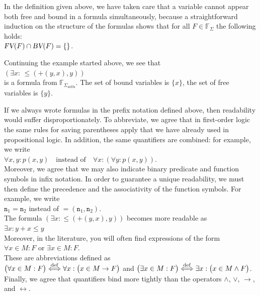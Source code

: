 In the definition given above, we have taken care that a variable cannot appear both free and bound in a
formula simultaneously, because a straightforward induction on the structure of the formulas shows that for all 
$F \in \mathbb{F}_\Sigma$ the following holds:  
\\[0.2cm]
\hspace*{1.3cm}
$ \textsl{FV}(F) \cap \textsl{BV}(F) = \{\}$. 

\exampleEng
Continuing the example started above, we see that \\[0.2cm]
\hspace*{1.3cm} $(\exists x \colon\, \leq\!(\mathtt{+}(y, x),y))$ \\[0.2cm]
is a formula from $\mathbb{F}_{\Sigma_{\mathrm{arith}}}$. 
The set of bound variables is $\{x\}$, the set of free variables is 
$\{ y \}$. \eox

If we always wrote formulas in the prefix notation defined above, then readability would suffer
disproportionately.  
To abbreviate, we agree that in first-order logic the same rules for saving parentheses apply that we have
already used in propositional logic. In addition, the same quantifiers are combined: for example, we write   
\\[0.2cm]
\hspace*{1.3cm}
$\forall x, y \colon p(x, y)  \quad \text{instead of} \quad \forall x \colon ( \forall y \colon p(x,y))$.
\\[0.2cm]
Moreover, we agree that we may also indicate binary predicate and function symbols in infix notation.
In order to guarantee a unique readability, we must then define the precedence and the associativity of the
function symbols.  For example, we write \\[0.2cm]
\hspace*{1.3cm} $\mathtt{n}_1 = \mathtt{n}_2$  \quad instead of \quad $=(\mathtt{n}_1, \mathtt{n}_2)$. \\[0.2cm]
The formula $(\exists x \colon \leq(\mathtt{+}(y, x),y))$ becomes more readable as \\[0.2cm]
\hspace*{1.3cm} $\exists x \colon y + x \leq y$ \\[0.2cm]
Moreover, in the literature, you will often find expressions of the form
\\[0.2cm]
\hspace*{1.3cm}
$\forall x \in M: F$ \quad or \quad $\exists x \in M: F$.
\\[0.2cm]
These are abbreviations defined as
\\[0.2cm]
\hspace*{1.3cm}
$\displaystyle \bigl(\forall x \in M: F\bigr) \stackrel{\mathrm{def}}{\Longleftrightarrow} \forall x: \bigl(x \in M \rightarrow F\bigr)$
\quad and \quad 
$\displaystyle\bigl(\exists x \in M: F\bigr) \stackrel{\mathrm{def}}{\Longleftrightarrow} \exists x: \bigl(x \in M \wedge F\bigr)$.
\\[0.2cm]
Finally, we agree that quantifiers bind more tightly than the operators $\wedge$, $\vee$, $\rightarrow$, and
$\leftrightarrow$. 

